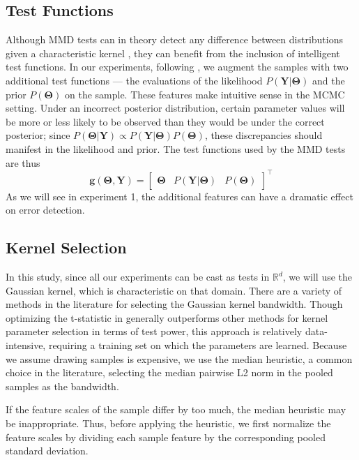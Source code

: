 \documentclass[a4paper,11pt]{article}
\begin{document}
\subsection{Test Functions}
Although MMD tests can in theory detect any difference between distributions given a characteristic kernel  \cite{gretton_kernel_2012}, they can benefit from the inclusion of intelligent test functions. In our experiments, following \cite{gandy_unit_2020}, we augment the samples with two additional test functions --- the evaluations of the likelihood $P(\mathbf{Y}|\mathbf{\Theta})$ and the prior $P(\mathbf{\Theta})$ on the sample. These features make intuitive sense in the MCMC setting. Under an incorrect posterior distribution, certain parameter values will be more or less likely to be observed than they would be under the correct posterior; since $P(\mathbf{\Theta}|\mathbf{Y}) \propto P(\mathbf{Y}|\mathbf{\Theta}) P(\mathbf{\Theta})$, these discrepancies should manifest in the likelihood and prior. The test functions used by the MMD tests are thus
\begin{equation}
    \mathbf{g}(\mathbf{\Theta}, \mathbf{Y}) = \begin{bmatrix} \mathbf{\Theta} & P(\mathbf{Y}|\mathbf{\Theta}) & P(\mathbf{\Theta}) \end{bmatrix}^{\top}
    \label{eq:testfn}
\end{equation}
As we will see in experiment 1, the additional features can have a dramatic effect on error detection.

\subsection{Kernel Selection}
In this study, since all our experiments can be cast as tests in $\mathbb{R}^{d}$, we will use the Gaussian kernel, which is characteristic on that domain. There are a variety of methods in the literature for selecting the Gaussian kernel bandwidth. Though optimizing the t-statistic in \cite{sutherland_generative_2019} generally outperforms other methods for kernel parameter selection in terms of test power, this approach is relatively data-intensive, requiring a training set on which the parameters are learned. Because we assume drawing samples is expensive, we use the median heuristic, a common choice in the literature, selecting the median pairwise L2 norm in the pooled samples as the bandwidth.

If the feature scales of the sample differ by too much, the median heuristic may be inappropriate. Thus, before applying the heuristic, we first normalize the feature scales by dividing each sample feature by the corresponding pooled standard deviation.
\end{document}
